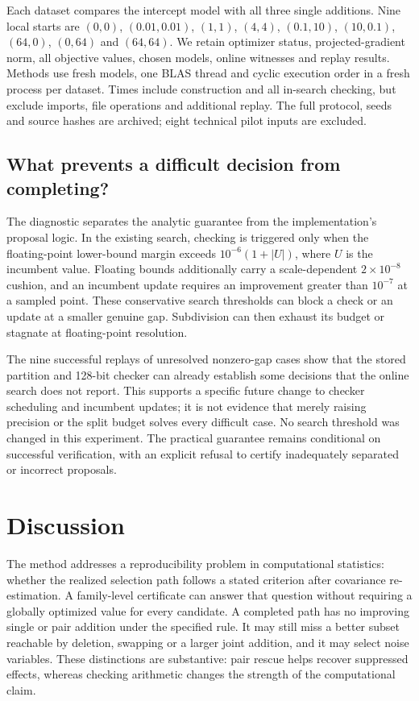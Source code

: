 \documentclass[preprint,11pt,numbers]{elsarticle}
\theoremstyle{remark}\newtheorem{remark}[theorem]{Remark}
\begin{document}
Each dataset compares the intercept model with all three single additions.
Nine local starts are $(0,0)$, $(0.01,0.01)$, $(1,1)$, $(4,4)$,
$(0.1,10)$, $(10,0.1)$, $(64,0)$, $(0,64)$ and $(64,64)$.
We retain optimizer status, projected-gradient norm, all objective values,
chosen models, online witnesses and replay results. Methods use fresh models,
one BLAS thread and cyclic execution order in a fresh process per dataset.
Times include construction and all in-search checking, but exclude imports,
file operations and additional replay. The full protocol, seeds and source
hashes are archived; eight technical pilot inputs are excluded.



\subsection{What prevents a difficult decision from completing?}
The diagnostic separates the analytic guarantee from the implementation's
proposal logic. In the existing search, checking is triggered only when the
floating-point lower-bound margin exceeds $10^{-6}(1+|U|)$, where $U$ is the
incumbent value. Floating bounds additionally carry a scale-dependent
$2\times10^{-8}$ cushion, and an incumbent update requires an improvement
greater than $10^{-7}$ at a sampled point. These conservative search thresholds
can block a check or an update at a smaller genuine gap. Subdivision can then
exhaust its budget or stagnate at floating-point resolution.

The nine successful replays of unresolved nonzero-gap cases show that the
stored partition and 128-bit checker can already establish some decisions
that the online search does not report. This supports a specific future change
to checker scheduling and incumbent updates; it is not evidence that merely
raising precision or the split budget solves every difficult case. No search
threshold was changed in this experiment. The practical guarantee remains
conditional on successful verification, with an explicit refusal to certify
inadequately separated or incorrect proposals.
\section{Discussion}
The method addresses a reproducibility problem in computational statistics:
whether the realized selection path follows a stated criterion after covariance
re-estimation. A family-level certificate can answer that question without
requiring a globally optimized value for every candidate. A completed path has
no improving single or pair addition under the specified rule. It may still
miss a better subset reachable by deletion, swapping or a larger joint addition,
and it may select noise variables. These distinctions are substantive: pair
rescue helps recover suppressed effects, whereas checking arithmetic changes
the strength of the computational claim.
\end{document}
